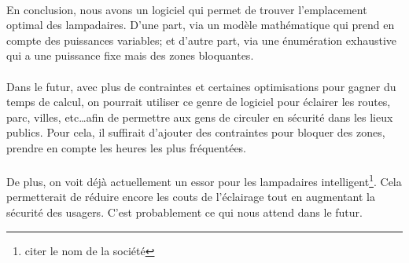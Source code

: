  \paragraph{} En conclusion, nous avons un logiciel qui permet de trouver l'emplacement optimal des lampadaires. D'une part, via un modèle mathématique qui prend en compte des puissances variables; et d'autre part, via une énumération exhaustive qui a une puissance fixe mais des zones bloquantes.

 \paragraph{} Dans le futur, avec plus de contraintes et certaines optimisations pour gagner du temps de calcul, on pourrait utiliser ce genre de logiciel pour éclairer les routes, parc, villes, etc\ldots afin de permettre aux gens de circuler en sécurité dans les lieux publics. Pour cela, il suffirait d'ajouter des contraintes pour bloquer des zones, prendre en compte les heures les plus fréquentées. 

 \paragraph{} De plus, on voit déjà actuellement un essor pour les lampadaires intelligent\footnote{citer le nom de la société}. Cela permetterait de réduire encore les couts de l'éclairage tout en augmentant la sécurité des usagers. C'est probablement ce qui nous attend dans le futur.